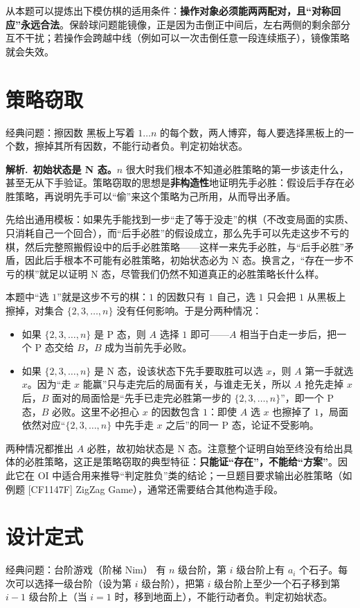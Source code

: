 \documentclass[UTF8,a4paper,11pt,oneside,openany,fontset=fandol]{ctexbook}
\theoremstyle{definition}
\newcommand{\sol}{\par\noindent\textbf{解析.}\ }
\begin{document}
从本题可以提炼出下模仿棋的适用条件：\textbf{操作对象必须能两两配对，且“对称回应”永远合法}。保龄球问题能镜像，正是因为击倒正中间后，左右两侧的剩余部分互不干扰；若操作会跨越中线（例如可以一次击倒任意一段连续瓶子），镜像策略就会失效。

\section{策略窃取}
\begin{problem}{经典问题：擦因数}
黑板上写着 $1\ldots n$ 的每个数，两人博弈，每人要选择黑板上的一个数，擦掉其所有因数，不能行动者负。判定初始状态。
\end{problem}

\sol \textbf{初始状态是 N 态。}$n$ 很大时我们根本不知道必胜策略的第一步该走什么，甚至无从下手验证。策略窃取的思想是\textbf{非构造性}地证明先手必胜：假设后手存在必胜策略，再说明先手可以“偷”来这个策略为己所用，从而导出矛盾。

先给出通用模板：如果先手能找到一步“走了等于没走”的棋（不改变局面的实质、只消耗自己一个回合），而“后手必胜”的假设成立，那么先手可以先走这步不亏的棋，然后完整照搬假设中的后手必胜策略——这样一来先手必胜，与“后手必胜”矛盾，因此后手根本不可能有必胜策略，初始状态必为 N 态。换言之，“存在一步不亏的棋”就足以证明 N 态，尽管我们仍然不知道真正的必胜策略长什么样。

本题中“选 $1$”就是这步不亏的棋：$1$ 的因数只有 $1$ 自己，选 $1$ 只会把 $1$ 从黑板上擦掉，对集合 $\{2,3,\ldots,n\}$ 没有任何影响。于是分两种情况：
\begin{itemize}
\item 如果 $\{2,3,\ldots,n\}$ 是 P 态，则 $A$ 选择 $1$ 即可——$A$ 相当于白走一步后，把一个 P 态交给 $B$，$B$ 成为当前先手必败。
\item 如果 $\{2,3,\ldots,n\}$ 是 N 态，设该状态下先手要取胜可以选 $x$，则 $A$ 第一手就选 $x$。因为“走 $x$ 能赢”只与走完后的局面有关，与谁走无关，所以 $A$ 抢先走掉 $x$ 后，$B$ 面对的局面恰是“先手已走完必胜第一步的 $\{2,3,\ldots,n\}$”，即一个 P 态，$B$ 必败。这里不必担心 $x$ 的因数包含 $1$：即使 $A$ 选 $x$ 也擦掉了 $1$，局面依然对应“$\{2,3,\ldots,n\}$ 中先手走 $x$ 之后”的同一 P 态，论证不受影响。
\end{itemize}
两种情况都推出 $A$ 必胜，故初始状态是 N 态。注意整个证明自始至终没有给出具体的必胜策略，这正是策略窃取的典型特征：\textbf{只能证“存在”，不能给“方案”}。因此它在 OI 中适合用来推导“判定胜负”类的结论；一旦题目要求输出必胜策略（如例题 [CF1147F] ZigZag Game），通常还需要结合其他构造手段。

\section{设计定式}
\begin{problem}{经典问题：台阶游戏（阶梯 Nim）}
有 $n$ 级台阶，第 $i$ 级台阶上有 $a_i$ 个石子。每次可以选择一级台阶（设为第 $i$ 级台阶），把第 $i$ 级台阶上至少一个石子移到第 $i-1$ 级台阶上（当 $i=1$ 时，移到地面上），不能行动者负。判定初始状态。
\end{problem}
\end{document}

